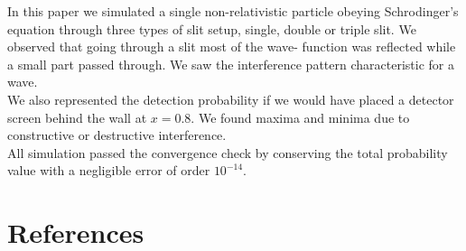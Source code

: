 \documentclass[english,notitlepage,reprint,nofootinbib]{revtex4-2}  %
\begin{document}
	In this paper we simulated a single non-relativistic particle obeying 
	Schrodinger's equation through three types of slit setup, single, double
	or triple slit. We observed that going through a slit most of the wave-
	function was reflected while a small part passed through. We saw the 
	interference pattern characteristic for a wave. \\
	
	We also represented the detection probability if we would have placed 
	a detector screen behind the wall at $x=0.8$. We found maxima and 
	minima due to constructive or destructive interference. \\
	
	All simulation passed the convergence check by conserving the total 
	probability value with a negligible error of order  $10^{-14}$. \\
	
	
	
	\onecolumngrid
	\section*{References}
	
	
	
\end{document}

